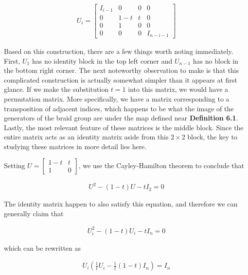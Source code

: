 \documentclass[10pt]{ucthesis}
\begin{document}
\begin{equation}
\begin{aligned}
U_i = \begin{bmatrix}
			I_{i-1}& 0 & 0 & 0 \\
			0 & 1-t & t & 0\\
			0 & 1 & 0 & 0\\
			0 & 0 & 0 & I_{n-i-1}
		\end{bmatrix}
\end{aligned}
\end{equation}

Based on this construction, there are a few things worth noting immediately. First, $U_1$ has no identity block in the top left corner and $U_{n-1}$ has no block in the bottom right corner. The next noteworthy observation to make is that this complicated construction is actually somewhat simpler than it appears at first glance. If we make the substitution $t=1$ into this matrix, we would have a permutation matrix. More specifically, we have a matrix corresponding to a transposition of adjacent indices, which happens to be what the image of the generators of the braid group are under the map defined near \textbf{Definition 6.1}. Lastly, the most relevant feature of these matrices is the middle block. Since the entire matrix acts as an identity matrix aside from this $2\times 2$ block, the key to studying these matrices in more detail lies here.

Setting $U= \begin{bmatrix} 1-t & t\\1 & 0 \end{bmatrix}$, we use the Cayley-Hamilton theorem to conclude that

\begin{equation}
\begin{aligned}
	U^2 - (1-t)U - tI_2 = 0
\end{aligned}
\end{equation}

The identity matrix happen to also satisfy this equation, and therefore we can generally claim that 

\begin{equation}
\begin{aligned}
	U_i^2 - (1-t)U_i - tI_n = 0
\end{aligned}
\end{equation}

which can be rewritten as 

\begin{equation}
\begin{aligned}
	U_i(\frac{1}{t}U_i - \frac{1}{t}(1-t)I_n) =I_n 
\end{aligned}
\end{equation}
\end{document}
